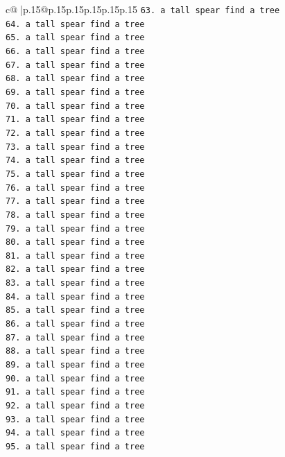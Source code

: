 \documentclass{article}
\begin{document}
{\begin{supertabular}{c@{$\;$}|p{.15\linewidth}@{}p{.15\linewidth}p{.15\linewidth}p{.15\linewidth}p{.15\linewidth}p{.15\linewidth}}
{{{\texttt{63. a tall spear find a tree} \\
\texttt{64. a tall spear find a tree} \\
\texttt{65. a tall spear find a tree} \\
\texttt{66. a tall spear find a tree} \\
\texttt{67. a tall spear find a tree} \\
\texttt{68. a tall spear find a tree} \\
\texttt{69. a tall spear find a tree} \\
\texttt{70. a tall spear find a tree} \\
\texttt{71. a tall spear find a tree} \\
\texttt{72. a tall spear find a tree} \\
\texttt{73. a tall spear find a tree} \\
\texttt{74. a tall spear find a tree} \\
\texttt{75. a tall spear find a tree} \\
\texttt{76. a tall spear find a tree} \\
\texttt{77. a tall spear find a tree} \\
\texttt{78. a tall spear find a tree} \\
\texttt{79. a tall spear find a tree} \\
\texttt{80. a tall spear find a tree} \\
\texttt{81. a tall spear find a tree} \\
\texttt{82. a tall spear find a tree} \\
\texttt{83. a tall spear find a tree} \\
\texttt{84. a tall spear find a tree} \\
\texttt{85. a tall spear find a tree} \\
\texttt{86. a tall spear find a tree} \\
\texttt{87. a tall spear find a tree} \\
\texttt{88. a tall spear find a tree} \\
\texttt{89. a tall spear find a tree} \\
\texttt{90. a tall spear find a tree} \\
\texttt{91. a tall spear find a tree} \\
\texttt{92. a tall spear find a tree} \\
\texttt{93. a tall spear find a tree} \\
\texttt{94. a tall spear find a tree} \\
\texttt{95. a tall spear find a tree} \\
}}}
\end{supertabular}}
\end{document}
